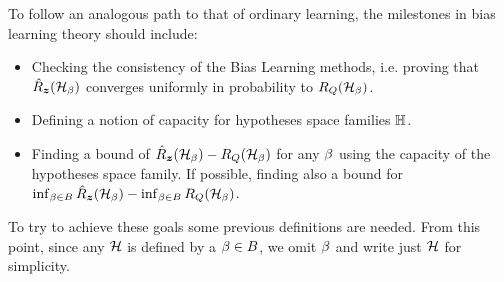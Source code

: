 To follow an analogous path to that of ordinary learning, the milestones in bias learning theory should include:
\begin{itemize}
    \item Checking the consistency of the Bias Learning methods, i.e. proving that $\hat{R}_{\bm{z}}(\mathcal{H}_\beta)$ converges uniformly in probability to $R_Q(\mathcal{H}_\beta)$.
    \item Defining a notion of capacity for hypotheses space families $\mathbb{H}$.
    \item Finding a bound of $\hat{R}_{\bm{z}}(\mathcal{H}_\beta) - R_Q(\mathcal{H}_\beta)$ for any $\beta$ using the capacity of the hypotheses space family. If possible, finding also a bound for $\inf_{\beta \in B}\hat{R}_{\bm{z}}(\mathcal{H}_\beta) - \inf_{\beta \in B} R_Q(\mathcal{H}_\beta)$.
\end{itemize}
To try to achieve these goals some previous definitions are needed. From this point, since any $\mathcal{H}$ is defined by a $\beta \in B$, we omit $\beta$ and write just $\mathcal{H}$ for simplicity.
%
